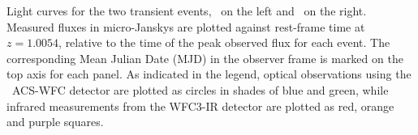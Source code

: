\label{fig:LightCurves}
Light curves for the two transient events, \spockone\ on the left
and \spocktwo\ on the right.  Measured fluxes in micro-Janskys are
plotted against rest-frame time at $z=1.0054$, relative to the time of
the peak observed flux for each event. The corresponding Mean Julian
Date (MJD) in the observer frame is marked on the top axis for each
panel.  As indicated in the legend, optical observations using
the \HST\ ACS-WFC detector are plotted as circles in shades of blue
and green, while infrared measurements from the WFC3-IR detector are
plotted as red, orange and purple squares.

  
